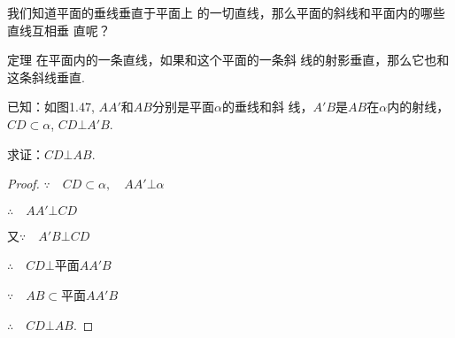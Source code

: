 我们知道平面的垂线垂直于平面上
  的一切直线，那么平面的斜线和平面内的哪些直线互相垂
  直呢？
  
\begin{blk}
{定理} 在平面内的一条直线，如果和这个平面的一条斜
  线的射影垂直，那么它也和这条斜线垂直. 
  \end{blk}

已知：如图1.47, $AA'$和$AB$分别是平面$\alpha$的垂线和斜
线，$A'B$是$AB$在$\alpha$内的射线，$CD\subset \alpha$, $CD\bot A'B$.

求证：$CD\bot AB$.

\begin{proof}
 $\because\quad  CD\subset \alpha,\quad AA'\bot \alpha$

$\therefore\quad  AA'\bot CD$

又$\because\quad A'B\bot CD$

$\therefore\quad CD\bot $平面$AA'B$

$\because\quad AB\subset $平面$AA'B$

$\therefore\quad CD\bot AB$.
\end{proof}

